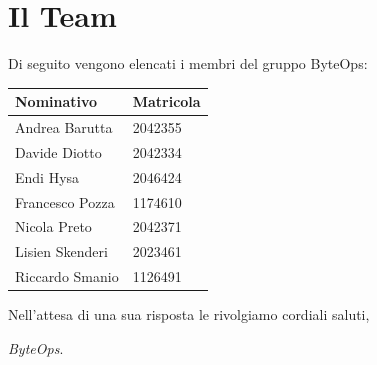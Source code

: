 \documentclass{article}
\begin{document}
\section{Il Team}
Di seguito vengono elencati i membri del gruppo ByteOps:

\vspace{1cm}

\begin{center}
    \begin{tabular}{|C{4cm}|C{2cm}|}
    \hline
        \textbf{Nominativo} & \textbf{Matricola} \\
        \hline\hline
        Andrea Barutta  & 2042355 \\
        \hline
        Davide Diotto   & 2042334 \\ 
        \hline
        Endi Hysa       & 2046424 \\ 
        \hline
        Francesco Pozza & 1174610 \\ 
        \hline
        Nicola Preto    & 2042371 \\ 
        \hline
        Lisien Skenderi & 2023461 \\ 
        \hline
        Riccardo Smanio & 1126491 \\ 
        \hline
    \end{tabular}
\end{center}

\vspace{1cm}
Nell'attesa di una sua risposta le rivolgiamo cordiali saluti,

\vspace{0.3cm}

\textit{ByteOps}.
\end{document}

